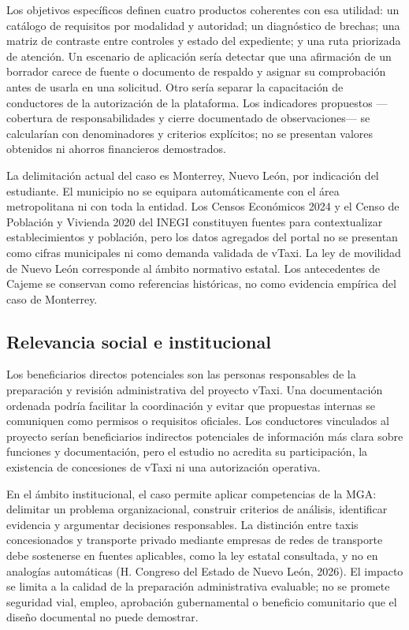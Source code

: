 {Los objetivos específicos definen cuatro productos coherentes con esa utilidad: un catálogo de requisitos por modalidad y autoridad; un diagnóstico de brechas; una matriz de contraste entre controles y estado del expediente; y una ruta priorizada de atención. Un escenario de aplicación sería detectar que una afirmación de un borrador carece de fuente o documento de respaldo y asignar su comprobación antes de usarla en una solicitud. Otro sería separar la capacitación de conductores de la autorización de la plataforma. Los indicadores propuestos —cobertura de responsabilidades y cierre documentado de observaciones— se calcularían con denominadores y criterios explícitos; no se presentan valores obtenidos ni ahorros financieros demostrados.


La delimitación actual del caso es Monterrey, Nuevo León, por indicación del estudiante. El municipio no se equipara automáticamente con el área metropolitana ni con toda la entidad. Los Censos Económicos 2024 y el Censo de Población y Vivienda 2020 del INEGI constituyen fuentes para contextualizar establecimientos y población, pero los datos agregados del portal no se presentan como cifras municipales ni como demanda validada de vTaxi. La ley de movilidad de Nuevo León corresponde al ámbito normativo estatal. Los antecedentes de Cajeme se conservan como referencias históricas, no como evidencia empírica del caso de Monterrey.


\subsection{Relevancia social e institucional}
Los beneficiarios directos potenciales son las personas responsables de la preparación y revisión administrativa del proyecto vTaxi. Una documentación ordenada podría facilitar la coordinación y evitar que propuestas internas se comuniquen como permisos o requisitos oficiales. Los conductores vinculados al proyecto serían beneficiarios indirectos potenciales de información más clara sobre funciones y documentación, pero el estudio no acredita su participación, la existencia de concesiones de vTaxi ni una autorización operativa.


En el ámbito institucional, el caso permite aplicar competencias de la MGA: delimitar un problema organizacional, construir criterios de análisis, identificar evidencia y argumentar decisiones responsables. La distinción entre taxis concesionados y transporte privado mediante empresas de redes de transporte debe sostenerse en fuentes aplicables, como la ley estatal consultada, y no en analogías automáticas (H. Congreso del Estado de Nuevo León, 2026). El impacto se limita a la calidad de la preparación administrativa evaluable; no se promete seguridad vial, empleo, aprobación gubernamental o beneficio comunitario que el diseño documental no puede demostrar.


}

